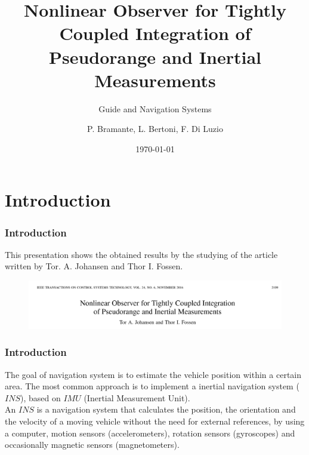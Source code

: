 \documentclass{beamer}
\title{Nonlinear Observer for Tightly Coupled Integration of Pseudorange and Inertial Measurements}
\subtitle{Guide and Navigation Systems}
\author{P. Bramante, L. Bertoni, F. Di Luzio}
\institute{Universit\`a degli Studi di Pisa \\ Master's Degree in Robotics and Automation Engineering}
\date{\today}
\begin{document}
	
	\begin{frame}
	\titlepage
	\end{frame}	



\section{Introduction}
	\begin{frame}
		\frametitle{Introduction}
		This presentation shows the obtained results by the studying of the article written by Tor. A. Johansen and Thor I. Fossen.
		\vspace{0.5cm}
		
	\begin{figure}[H]
			\centering
			\includegraphics[scale=0.3]{title}
		\end{figure}
	\end{frame}

	\begin{frame}
		\frametitle{Introduction}
	The goal of navigation system is to estimate the vehicle position within a certain area. The most common approach is to implement a inertial navigation system ($INS$), based on $IMU$ (Inertial Measurement Unit).\\
	\vspace{0.3cm}
	An $INS$ is a navigation system that calculates the position, the orientation and the velocity of a moving vehicle without the need for external references, by using a computer, motion sensors (accelerometers), rotation sensors (gyroscopes) and occasionally magnetic sensors (magnetometers).
	
	
	\end{frame}
\end{document}
